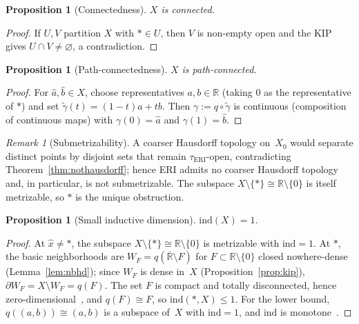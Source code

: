 \documentclass[11pt]{article}
\newtheorem{proposition}[theorem]{Proposition}
\theoremstyle{definition}
\theoremstyle{remark}
\newtheorem{remark}[theorem]{Remark}
\begin{document}
\begin{proposition}[Connectedness]\label{prop:connected}
$X$ is connected.
\end{proposition}
\begin{proof}
If $U, V$ partition $X$ with $\ast \in U$, then $V$ is non-empty open and
the KIP gives $U \cap V \neq \varnothing$, a contradiction.
\end{proof}

\begin{proposition}[Path-connectedness]\label{prop:pathconn}
$X$ is path-connected.
\end{proposition}
\begin{proof}
For $\hat{a}, \hat{b} \in X$, choose representatives
$a, b \in \mathbb{R}$ (taking $0$ as the representative of $\ast$) and
set $\tilde\gamma(t) = (1-t)a + tb$.
Then $\gamma := q \circ \tilde\gamma$ is continuous (composition of
continuous maps) with $\gamma(0) = \hat{a}$ and $\gamma(1) = \hat{b}$.
\end{proof}

\begin{remark}[Submetrizability]\label{rmk:submetrizable}
A coarser Hausdorff topology on~$X_0$ would separate distinct points
by disjoint sets that remain $\tau_{\mathrm{ERI}}$-open, contradicting
Theorem~\ref{thm:nothausdorff}; hence ERI admits no coarser Hausdorff
topology and, in particular, is not submetrizable.
The subspace $X \setminus \{\ast\} \cong \mathbb{R} \setminus \{0\}$
is itself metrizable, so $\ast$ is the unique obstruction.
\end{remark}

\begin{proposition}[Small inductive dimension]\label{prop:dim}
$\mathrm{ind}(X) = 1$.
\end{proposition}
\begin{proof}
At $\hat{x} \neq \ast$, the subspace
$X \setminus \{\ast\} \cong \mathbb{R} \setminus \{0\}$ is metrizable
with $\mathrm{ind} = 1$.
At $\ast$, the basic neighborhoods are
$W_F = q(\overline{\mathbb{R}} \setminus F)$ for $F \subset \mathbb{R}
\setminus \{0\}$ closed nowhere-dense (Lemma~\ref{lem:nbhd}); since
$W_F$ is dense in~$X$ (Proposition~\ref{prop:kip}),
$\partial W_F = X \setminus W_F = q(F)$.
The set $F$ is compact and totally disconnected, hence
zero-dimensional~\cite[Theorem~1.3.4]{bib:engelking}, and
$q(F) \cong F$, so $\mathrm{ind}(\ast, X) \leq 1$.
For the lower bound, $q((a,b)) \cong (a,b)$ is a subspace of~$X$ with
$\mathrm{ind} = 1$, and $\mathrm{ind}$ is
monotone~\cite{bib:engelking}.
\end{proof}
\end{document}
